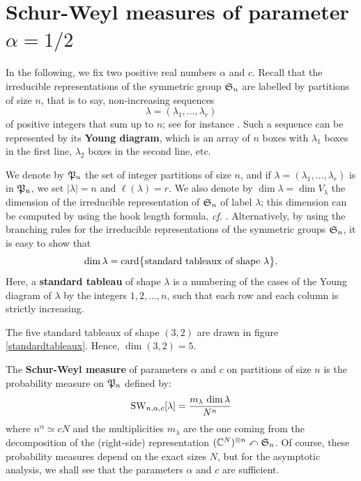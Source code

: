 \documentclass[10pt]{amsart}
\begin{document}
\section{Schur-Weyl measures of parameter $\alpha=1/2$}\label{swbiane}
In the following, we fix two positive real numbers $\alpha$ and $c$. Recall that the irreducible representations of the symmetric group $\mathfrak{S}_{n}$ are labelled by partitions of size $n$, that is to say, non-increasing sequences 
$$\lambda=(\lambda_{1},\ldots,\lambda_{r})$$
of positive integers that sum up to $n$; see for instance \cite[Chapter 4]{Weyl39}. Such a sequence can be represented by its \textbf{Young diagram}, which is an array of $n$ boxes with $\lambda_{1}$ boxes in the first line, $\lambda_{2}$ boxes in the second line, etc.
\bigskip



 We denote by $\mathfrak{P}_{n}$ the set of integer partitions of size $n$, and if $\lambda=(\lambda_{1},\ldots,\lambda_{r})$ is in $\mathfrak{P}_{n}$, we set $|\lambda|=n$ and $\ell(\lambda)=r$. We also denote by $\dim \lambda=\dim V_{\lambda}$ the dimension of the irreducible representation of $\mathfrak{S}_{n}$ of label $\lambda$; this dimension can be computed by using the hook length formula, \emph{cf.} \cite[Chapter 1, \S7]{Mac95}. Alternatively, by using the branching rules for the irreducible representations of the symmetric groups $\mathfrak{S}_{n}$, it is easy to show that 
$$\dim \lambda=\mathrm{card}\big\{\text{standard tableaux of shape }\lambda\big\}.$$
Here, a \textbf{standard tableau} of shape $\lambda$ is a numbering of the cases of the Young diagram of $\lambda$ by the integers $1,2,\ldots,n$, such that each row and each column is strictly increasing.
\begin{example}
The five standard tableaux of shape $(3,2)$ are drawn in figure \ref{standardtableaux}. Hence, $\dim(3,2)=5$.
\end{example}

 The \textbf{Schur-Weyl measure} of parameters $\alpha$ and $c$ on partitions of size $n$ is the probability measure on $\mathfrak{P}_{n}$ defined by:
$$\mathrm{SW}_{n,\alpha,c}[\lambda]=\frac{m_{\lambda}\,\dim \lambda}{N^{n}}$$
where $n^{\alpha}\simeq cN$ and the multiplicities $m_{\lambda}$ are the one coming from the decomposition of the (right-side) representation $(\mathbb{C}^{N})^{\otimes n} \curvearrowleft \mathfrak{S}_{n}$. Of course, these probability measures depend on the exact sizes $N$, but for the asymptotic analysis, we shall see that the parameters $\alpha$ and $c$ are sufficient. \bigskip
\end{document}
